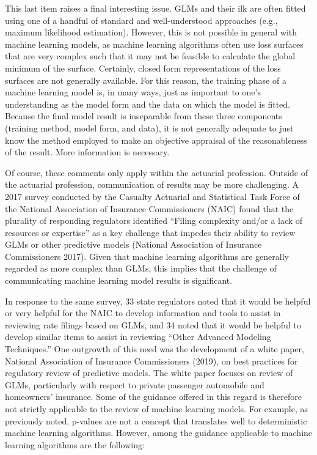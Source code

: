 \documentclass[preprint, 3p, twocolumn, letterpaper, 10pt]{elsarticle} %
\begin{document}
This last item raises a final interesting issue. GLMs and their ilk are often
fitted using one of a handful of standard and well-understood approaches (e.g.,
maximum likelihood estimation). However, this is not possible in general with
machine learning models, as machine learning algorithms often use loss surfaces
that are very complex such that it may not be feasible to calculate the global
minimum of the surface. Certainly, closed form representations of the loss
surfaces are not generally available. For this reason, the training phase of a
machine learning model is, in many ways, just as important to one's
understanding as the model form and the data on which the model is fitted.
Because the final model result is inseparable from these three components
(training method, model form, and data), it is not generally adequate to just
know the method employed to make an objective appraisal of the reasonableness
of the result. More information is necessary.

Of course, these comments only apply within the actuarial profession. Outside of
the actuarial profession, communication of results may be more challenging. A
2017 survey conducted by the Casualty Actuarial and Statistical Task Force of
the National Association of Insurance Commissioners (NAIC) found that the plurality of
responding regulators identified ``Filing complexity and/or a lack of resources
or expertise'' as a key challenge that impedes their ability to review GLMs or
other predictive models (National Association of Insurance Commissioners 2017). Given that machine learning
algorithms are generally regarded as more complex than GLMs, this implies that
the challenge of communicating machine learning model results is significant.

In response to the same survey, 33 state regulators noted that it would be
helpful or very helpful for the NAIC to develop information and tools to assist
in reviewing rate filings based on GLMs, and 34 noted that it would be helpful
to develop similar items to assist in reviewing ``Other Advanced Modeling
Techniques.'' One outgrowth of this need was the development of a white paper,
National Association of Insurance Commissioners (2019), on best practices for regulatory review of predictive models.
The white paper focuses on review of GLMs, particularly with respect to private
passenger automobile and homeowners' insurance. Some of the guidance offered in
this regard is therefore not strictly applicable to the review of machine
learning models. For example, as previously noted, p-values are not a concept
that translates well to deterministic machine learning algorithms. However,
among the guidance applicable to machine learning algorithms are the following:
\end{document}
